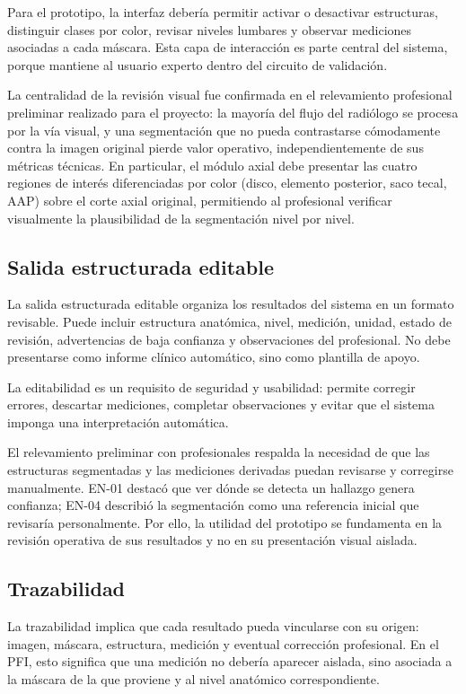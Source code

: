 Para el prototipo, la interfaz debería permitir activar o desactivar estructuras, distinguir clases por color, revisar niveles lumbares y observar mediciones asociadas a cada máscara. Esta capa de interacción es parte central del sistema, porque mantiene al usuario experto dentro del circuito de validación.

La centralidad de la revisión visual fue confirmada en el relevamiento profesional preliminar realizado para el proyecto: la mayoría del flujo del radiólogo se procesa por la vía visual, y una segmentación que no pueda contrastarse cómodamente contra la imagen original pierde valor operativo, independientemente de sus métricas técnicas. En particular, el módulo axial debe presentar las cuatro regiones de interés diferenciadas por color (disco, elemento posterior, saco tecal, AAP) sobre el corte axial original, permitiendo al profesional verificar visualmente la plausibilidad de la segmentación nivel por nivel.

\subsection{Salida estructurada editable}

La salida estructurada editable organiza los resultados del sistema en un formato revisable. Puede incluir estructura anatómica, nivel, medición, unidad, estado de revisión, advertencias de baja confianza y observaciones del profesional. No debe presentarse como informe clínico automático, sino como plantilla de apoyo.

La editabilidad es un requisito de seguridad y usabilidad: permite corregir errores, descartar mediciones, completar observaciones y evitar que el sistema imponga una interpretación automática.

El relevamiento preliminar con profesionales respalda la necesidad de que las estructuras segmentadas y las mediciones derivadas puedan revisarse y corregirse manualmente. EN-01 destacó que ver dónde se detecta un hallazgo genera confianza; EN-04 describió la segmentación como una referencia inicial que revisaría personalmente. Por ello, la utilidad del prototipo se fundamenta en la revisión operativa de sus resultados y no en su presentación visual aislada.

\subsection{Trazabilidad}

La trazabilidad implica que cada resultado pueda vincularse con su origen: imagen, máscara, estructura, medición y eventual corrección profesional. En el PFI, esto significa que una medición no debería aparecer aislada, sino asociada a la máscara de la que proviene y al nivel anatómico correspondiente.

